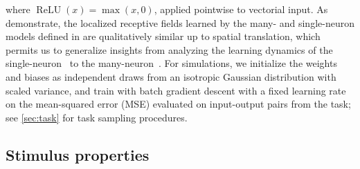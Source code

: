 where $\operatorname{ReLU}(x) = \max(x,0)$, applied pointwise to vectorial input.
As \textcite{ingrosso2022data} demonstrate, the localized receptive fields learned by the 
many- and single-neuron models defined in  are qualitatively similar up to spatial translation, 
which permits us to generalize insights from analyzing the learning dynamics of the single-neuron~ to the many-neuron~.
For simulations, we initialize the weights and biases
as independent draws from an isotropic Gaussian distribution with scaled variance,
and train with batch gradient descent with a fixed learning rate on the mean-squared error
(MSE) evaluated on input-output pairs from the task; see \cref{sec:task} for task sampling procedures.

\subsection{Stimulus properties}
\label{sec:input}

